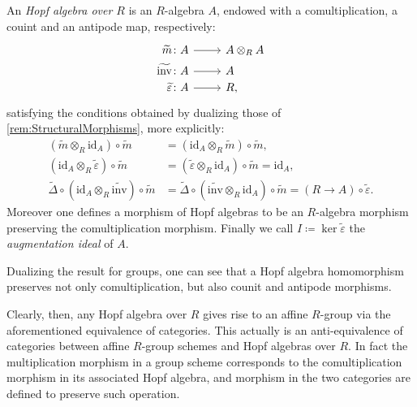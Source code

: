 \begin{defn}\label{defn:HopfAlgebra}
	An {\em Hopf algebra over $R$} is an $R$-algebra $A$,
	endowed with a comultiplication, a couint and an antipode map,
	respectively:
	\begin{equation*}
			\begin{tikzcd}[row sep = 0ex
         ,/tikz/column 1/.append style={anchor=base east}
         ,/tikz/column 2/.append style={anchor=base west}
         ,/tikz/column 3/.append style={anchor=base east}]
			\widetilde{m}\colon A \arrow[r, "", rightarrow] &
			A \otimes_R A \\
			\widetilde{\mathrm{inv}}\colon A \arrow[r, "", rightarrow] &
			A \\
			\widetilde{\varepsilon} \colon A \arrow[r, "", rightarrow] &
			R,
		\end{tikzcd}
	\end{equation*} 
	satisfying the conditions obtained by dualizing those
	of \cref{rem:StructuralMorphisms}, more explicitly:
	\begin{align*}
		( \widetilde{m} \otimes_R \mathrm{id}_{ A } ) \circ \widetilde{m} &=
		( \mathrm{id}_{ A } \otimes_R \widetilde{m} ) \circ \widetilde{m},\\
		( \mathrm{id}_{ A } \otimes_R \widetilde{\varepsilon} ) \circ \widetilde{m} &=
		( \widetilde{\varepsilon} \otimes_R \mathrm{id}_{ A } ) \circ \widetilde{m} =
		\mathrm{id}_{ A },\\
		\widetilde{\Delta} \circ ( \mathrm{id}_{ A } \otimes_R \widetilde{\mathrm{inv}} ) 
		\circ \widetilde{m} &=
		\widetilde{\Delta} \circ ( \widetilde{\mathrm{inv}} \otimes_R \mathrm{id}_{ A } ) 
		\circ \widetilde{m} =
		(R \to A) \circ \widetilde{\varepsilon}
	.\end{align*} 
	Moreover one defines a morphism of Hopf algebras to be an $R$-algebra
	morphism preserving the comultiplication morphism.
	Finally we call $I \coloneqq \ker \widetilde{\varepsilon}$ the 
	{\em augmentation ideal} of $A$.
\end{defn}


\begin{rem}[]
	Dualizing the result for groups, one can see that a Hopf algebra
	homomorphism preserves not only comultiplication, but also
	counit and antipode morphisms.
\end{rem}


\begin{rem}
	Clearly, then, any Hopf algebra over $R$ gives rise
	to an affine $R$-group via the aforementioned equivalence of categories.
	This actually is an anti-equivalence of categories between affine
	$R$-group schemes and Hopf algebras over $R$.
	In fact	the multiplication morphism in a group scheme
	corresponds to the comultiplication morphism in its 
	associated Hopf algebra, and morphism in the two categories are defined
	to preserve such operation.
\end{rem}


